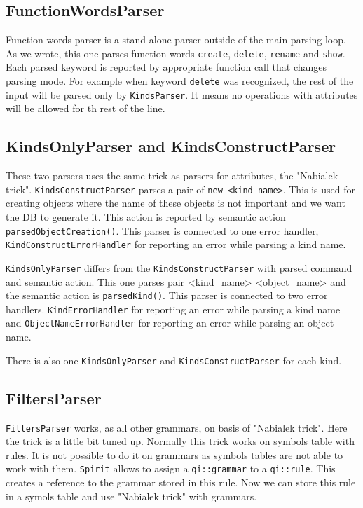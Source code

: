 \documentclass[deska]{subfiles}
\begin{document}
\subsection{FunctionWordsParser}

Function words parser is a stand-alone parser outside of the main parsing loop. As we wrote, this one parses function words
{\tt create}, {\tt delete}, {\tt rename} and {\tt show}. Each parsed keyword is reported by appropriate function call that changes parsing mode.
For example when keyword {\tt delete} was recognized, the rest of the input will be parsed only by {\tt KindsParser}. It means
no operations with attributes will be allowed for th rest of the line.

\subsection{KindsOnlyParser and KindsConstructParser}

These two parsers uses the same trick as parsers for attributes, the "Nabialek trick". {\tt KindsConstructParser} parses
a pair of {\tt new <kind\_name>}. This is used for creating objects where the name of these objects is not important and we
want the DB to generate it. This action is reported by semantic action {\tt parsedObjectCreation()}. This parser is connected
to one error handler, {\tt KindConstructErrorHandler} for reporting an error while parsing a kind name.

{\tt KindsOnlyParser} differs from the {\tt KindsConstructParser} with parsed command and semantic action. This one parses
pair <kind\_name> <object\_name> and the semantic action is {\tt parsedKind()}. This parser is connected to two error handlers.
{\tt KindErrorHandler} for reporting an error while parsing a kind name and {\tt ObjectNameErrorHandler} for reporting an
error while parsing an object name.

There is also one {\tt KindsOnlyParser} and {\tt KindsConstructParser} for each kind. 

\subsection{FiltersParser}

{\tt FiltersParser} works, as all other grammars, on basis of "Nabialek trick". Here the trick is a little bit tuned up.
Normally this trick works on symbols table with rules. It is not possible to do it on grammars as symbols tables are not
able to work with them. {\tt Spirit} allows to assign a {\tt qi::grammar} to a {\tt qi::rule}. This creates a reference
to the grammar stored in this rule. Now we can store this rule in a symols table and use "Nabialek trick" with grammars.
\end{document}
